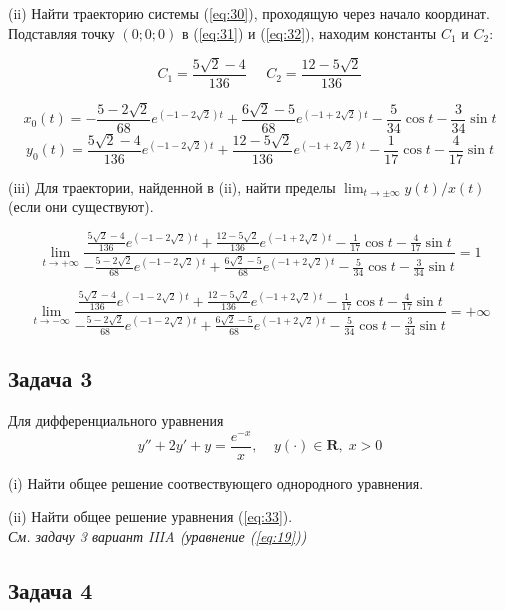 \documentclass[a4paper, 12pt]{article}
\begin{document}
(ii) Найти траекторию системы (\ref{eq:30}), проходящую через начало координат.\\
Подставляя точку $(0;0;0)$ в (\ref{eq:31}) и (\ref{eq:32}), находим константы $C_1$ и $C_2$:

\[C_1 = \frac{5\sqrt{2}-4}{136}\;\;\;\;\; C_2 = \frac{12- 5\sqrt{2}}{136}\]

\[
x_0(t) = -\frac{5-2\sqrt{2}}{68} e^{(-1-2\sqrt 2)t}+\frac{6\sqrt{2}- 5}{68} e^{(-1+2\sqrt 2)t} -\frac {5} {34}\cos{t}-\frac {3} {34}\sin{t}
\]\[
y_0(t) = \frac{5\sqrt{2}-4}{136} e^{(-1-2\sqrt 2)t}+\frac{12- 5\sqrt{2}}{136}e^{(-1+2\sqrt 2)t} -\frac {1} {17}\cos{t}-\frac {4} {17}\sin{t}
\]

(iii) Для траектории, найденной в (ii), найти пределы $\lim_{t\rightarrow\pm\infty}y(t)/x(t)$ (если они существуют).


\[\lim_{t\rightarrow+\infty}\frac{\frac{5\sqrt{2}-4}{136} e^{(-1-2\sqrt 2)t}+\frac{12- 5\sqrt{2}}{136}e^{(-1+2\sqrt 2)t} -\frac {1} {17}\cos{t}-\frac {4} {17}\sin{t}}{-\frac{5-2\sqrt{2}}{68} e^{(-1-2\sqrt 2)t}+\frac{6\sqrt{2}- 5}{68} e^{(-1+2\sqrt 2)t} -\frac {5} {34}\cos{t}-\frac {3} {34}\sin{t}}=1 \]

\[\lim_{t\rightarrow-\infty}\frac{\frac{5\sqrt{2}-4}{136} e^{(-1-2\sqrt 2)t}+\frac{12- 5\sqrt{2}}{136}e^{(-1+2\sqrt 2)t} -\frac {1} {17}\cos{t}-\frac {4} {17}\sin{t}}{-\frac{5-2\sqrt{2}}{68} e^{(-1-2\sqrt 2)t}+\frac{6\sqrt{2}- 5}{68} e^{(-1+2\sqrt 2)t} -\frac {5} {34}\cos{t}-\frac {3} {34}\sin{t}}=+\infty\]





	\subsection {Задача 3}
Для дифференциального уравнения 
\begin{equation}
y''+2y'+y=\frac{e^{-x}}{x}, \;\;\;\; y(\cdot)\in \textbf{R},\; x>0
\label{eq:33}
\end{equation}

(i) Найти общее решение соотвествующего однородного уравнения.

(ii) Найти общее решение уравнения (\ref{eq:33}).\\
\textit{См. задачу 3 вариант IIIA (уравнение (\ref{eq:19}))}


	\subsection {Задача 4}
\end{document}
